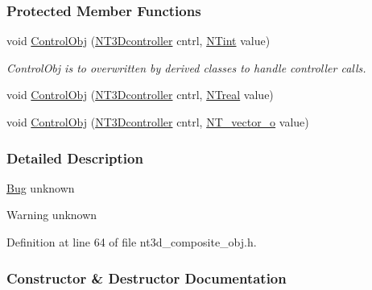 \subsubsection*{Protected Member Functions}
\begin{DoxyCompactItemize}
\item 
void \hyperlink{class_n_t3_d__composite__o_ad82370b40330d4b96128da96bf4d98b1}{ControlObj} (\hyperlink{nt3d__object__obj_8h_ae59ecf13a3631bc4a9ea41f90de08351}{NT3Dcontroller} cntrl, \hyperlink{nt__types_8h_aee8aa0a9869e8b5c97c6c02217ff09cd}{NTint} value)
\begin{DoxyCompactList}\small\item\em ControlObj is to overwritten by derived classes to handle controller calls. \item\end{DoxyCompactList}\item 
void \hyperlink{class_n_t3_d__composite__o_af447188a4abc0e429465d942a517bf5a}{ControlObj} (\hyperlink{nt3d__object__obj_8h_ae59ecf13a3631bc4a9ea41f90de08351}{NT3Dcontroller} cntrl, \hyperlink{nt__types_8h_a814a97893e9deb1eedcc7604529ba80d}{NTreal} value)
\item 
void \hyperlink{class_n_t3_d__composite__o_a45158da53a1f8a372b84150e96ae7f79}{ControlObj} (\hyperlink{nt3d__object__obj_8h_ae59ecf13a3631bc4a9ea41f90de08351}{NT3Dcontroller} cntrl, \hyperlink{class_n_t__vector__o}{NT\_\-vector\_\-o} value)
\end{DoxyCompactItemize}


\subsubsection{Detailed Description}
\begin{Desc}
\item[\hyperlink{bug__bug000012}{Bug}]unknown \end{Desc}
\begin{DoxyWarning}{Warning}
unknown 
\end{DoxyWarning}


Definition at line 64 of file nt3d\_\-composite\_\-obj.h.



\subsubsection{Constructor \& Destructor Documentation}
